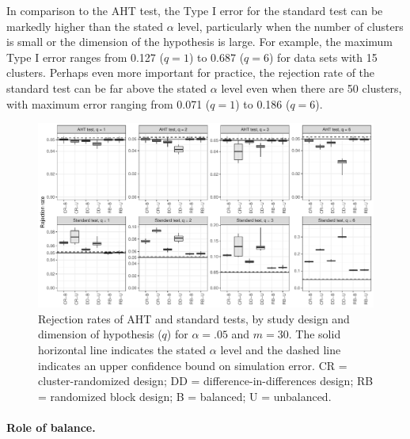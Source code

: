\documentclass[12pt]{article}
\begin{document}
In comparison to the AHT test, the Type I error for the standard test
can be markedly higher than the stated \(\alpha\) level, particularly
when the number of clusters is small or the dimension of the hypothesis
is large. For example, the maximum Type I error ranges from 0.127
(\(q = 1\)) to 0.687 (\(q = 6\)) for data sets with 15 clusters. Perhaps
even more important for practice, the rejection rate of the standard
test can be far above the stated \(\alpha\) level even when there are 50
clusters, with maximum error ranging from 0.071 (\(q = 1\)) to 0.186
(\(q = 6\)).

\begin{figure}

{\centering \includegraphics[width=\linewidth]{CR_fig/balance-1} 

}

\caption{Rejection rates of AHT and standard tests, by study design and dimension of hypothesis ($q$) for $\alpha = .05$ and $m = 30$. The solid horizontal line indicates the stated $\alpha$ level and the dashed line indicates an upper confidence bound on simulation error. CR = cluster-randomized design; DD = difference-in-differences design; RB = randomized block design; B = balanced; U = unbalanced.}\label{fig:balance}
\end{figure}

\hypertarget{role-of-balance.}{%
\paragraph{Role of balance.}\label{role-of-balance.}}
\end{document}
